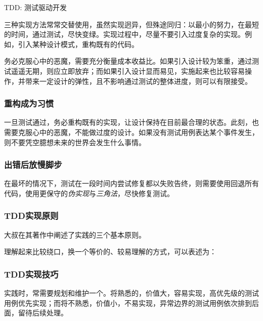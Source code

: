 \begin{content}
\begin{episode}{TDD: 测试驱动开发}
\begin{content}
三种实现方法常常交替使用，虽然实现迥异，但殊途同归：以最小的努力，在最短的时间，通过测试，尽快变绿。实现过程中，尽量不要引入过度复杂的实现。例如，引入某种设计模式，重构既有的代码。

务必克服心中的恶魔，需要充分衡量成本收益比。如果引入设计较为笨重，通过测试遥遥无期，则应立即放弃；而如果引入设计显而易见，实施起来也比较容易操作，并带来一定设计的弹性，且不影响通过测试的整体进度，则可以有限接受。

\subsubsection{重构成为习惯}

一旦测试通过，务必重构既有的实现，让设计保持在目前最合理的状态。此刻，也需要克服心中的恶魔，不能做过度的设计。如果没有测试用例表达某个事件发生，则不要凭空臆想未来的世界会发生什么事情。

\subsubsection{出错后放慢脚步}

在最坏的情况下，测试在一段时间内尝试修复都以失败告终，则需要使用回退所有代码，使用更保守的\emph{伪实现}与\emph{三角法}，尽快修复测试。

\subsubsection{TDD实现原则}

大叔在其著作中阐述了实践的三个基本原则。

\begin{enum}
\end{enum}

理解起来比较绕口，换一个等价的、较易理解的方式，可以表述为：

\begin{enum}
\end{enum}

\subsubsection{TDD实现技巧}

实践时，常需要规划和维护一个。将熟悉的，价值大，容易实现，高优先级的测试用例优先实现；而将不熟悉，价值小，不易实现，异常边界的测试用例依次排到后面，留待后续处理。


\end{content}
\end{episode}
\end{content}
